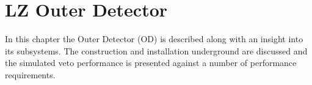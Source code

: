 \chapter{LZ Outer Detector}
\label{chapter:lz_outer_detector}
\par
In this chapter the Outer Detector (OD) is described along with an insight into its subsystems.
The construction and installation underground are discussed and the simulated veto performance is presented against a number of performance requirements.




\clearpage

\clearpage
